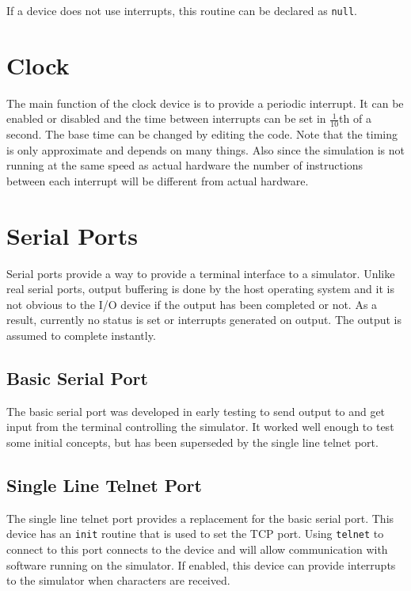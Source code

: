 \documentclass[10pt, openany]{book}
\begin{document}
If a device does not use interrupts, this routine can be declared as \verb|null|.

\section{Clock}
The main function of the clock device is to provide a periodic interrupt.  It can be enabled or disabled and the time between interrupts can be set in $\frac{1}{10}$th of a second.  The base time can be changed by editing the code.  Note that the timing is only approximate and depends on many things.  Also since the simulation is not running at the same speed as actual hardware the number of instructions between each interrupt will be different from actual hardware.

\section{Serial Ports}
Serial ports provide a way to provide a terminal interface to a simulator.  Unlike real serial ports, output buffering is done by the host operating system and it is not obvious to the I/O device if the output has been completed or not.  As a result, currently no status is set or interrupts generated on output.  The output is assumed to complete instantly.

\subsection{Basic Serial Port}
The basic serial port was developed in early testing to send output to and get input from the terminal controlling the simulator.  It worked well enough to test some initial concepts, but has been superseded by the single line telnet port.

\subsection{Single Line Telnet Port}
The single line telnet port provides a replacement for the basic serial port.  This device has an \verb|init| routine that is used to set the TCP port.  Using \verb|telnet| to connect to this port connects to the device and will allow communication with software running on the simulator.  If enabled, this device can provide interrupts to the simulator when characters are received.
\end{document}
